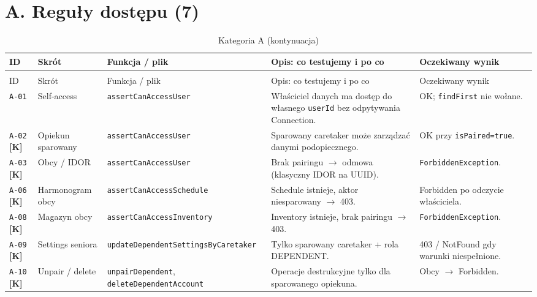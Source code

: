\documentclass[11pt,a4paper]{article}
\newcommand{\kryt}{\textcolor{red!70!black}{\textbf{[K]}}}
\newcommand{\testid}[1]{\texttt{#1}}
\begin{document}
\newcommand{\casetablehead}{%
  \toprule
  ID & Skrót & Funkcja / plik & Opis: co testujemy i po co & Oczekiwany wynik \\
  \midrule
}
\newcommand{\casetablefoot}{\bottomrule}

\section{A. Reguły dostępu (7)}

\begin{longtable}{@{}L{1.6cm}L{2.4cm}L{3.2cm}L{5.2cm}L{3.4cm}@{}}
\caption{Kategoria A --- 7 przypadków}\\
\casetablehead
\endfirsthead
\caption[]{Kategoria A (kontynuacja)}\\
\casetablehead
\endhead
\casetablefoot
\endfoot

\testid{A-01} &
Self-access &
\texttt{assertCanAccessUser} &
Właściciel danych ma dostęp do własnego \texttt{userId} bez odpytywania Connection. &
OK; \texttt{findFirst} nie wołane. \\
\midrule

\testid{A-02} \kryt &
Opiekun sparowany &
\texttt{assertCanAccessUser} &
Sparowany caretaker może zarządzać danymi podopiecznego. &
OK przy \texttt{isPaired=true}. \\
\midrule

\testid{A-03} \kryt &
Obcy / IDOR &
\texttt{assertCanAccessUser} &
Brak pairingu $\to$ odmowa (klasyczny IDOR na UUID). &
\texttt{ForbiddenException}. \\
\midrule

\testid{A-06} \kryt &
Harmonogram obcy &
\texttt{assertCanAccessSchedule} &
Schedule istnieje, aktor niesparowany $\to$ 403. &
Forbidden po odczycie właściciela. \\
\midrule

\testid{A-08} \kryt &
Magazyn obcy &
\texttt{assertCanAccessInventory} &
Inventory istnieje, brak pairingu $\to$ 403. &
\texttt{ForbiddenException}. \\
\midrule

\testid{A-09} \kryt &
Settings seniora &
\texttt{updateDependentSettingsByCaretaker} &
Tylko sparowany caretaker + rola DEPENDENT. &
403 / NotFound gdy warunki niespełnione. \\
\midrule

\testid{A-10} \kryt &
Unpair / delete &
\texttt{unpairDependent}, \texttt{deleteDependentAccount} &
Operacje destrukcyjne tylko dla sparowanego opiekuna. &
Obcy $\to$ Forbidden. \\

\end{longtable}
\end{document}

